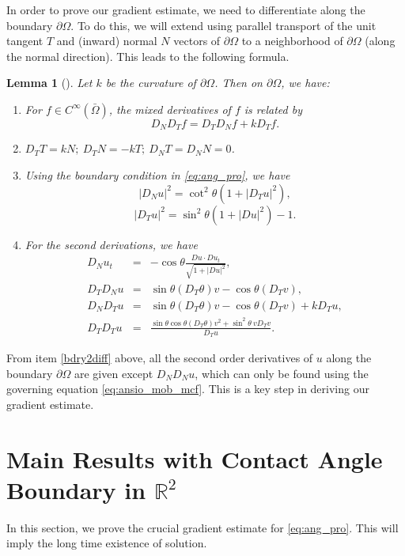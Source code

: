 \documentclass[12pt]{article}
\numberwithin{equation}{section}
\theoremstyle{plain}
\newtheorem{lemma}[theorem]{Lemma}
\theoremstyle{definition}
\theoremstyle{remark}
\begin{document}
In order to prove our gradient estimate, we need to differentiate along the boundary $\partial\Omega$. 
To do this, we will extend using parallel transport of the unit tangent $T$ and (inward) normal $N$ vectors of $\partial\Omega$ to a neighborhood of $\partial\Omega$ (along the normal direction). This leads to the following formula.
\begin{lemma}[\cite{AW2}]\label{lem:bd_grad_cal} Let $k$ be the curvature of $\partial\Omega$. Then on $\partial \Omega$, we have:
\begin{enumerate}
\item For $f\in C^{\infty}(\bar{\Omega})$, the mixed derivatives of $f$ is related by
\begin{equation*}
D_N D_T f=D_T D_N f+k D_T f.
\end{equation*}

\item $D_T T=k N;\ D_T N=-k T;\ D_N T=D_N N=0 $.
\item Using the boundary condition in \eqref{eq:ang_pro}, we have 
$$ |D_N u|^2 = \cot^2 \theta ( 1+|D_T u|^2), $$
$$ |D_T u|^2 = \sin^2 \theta ( 1+|Du|^2 ) - 1. $$
\item\label{bdry2diff} For the second derivations, we have
\begin{eqnarray*}
D_N u_t &=&-\cos{\theta} \frac{Du \cdot Du_t}{\sqrt{1+|Du|^2}},\\
D_T D_N u  &=& \sin{\theta}(D_T \theta)v-\cos{\theta}(D_T v),\\
D_N D_T u &=& \sin{\theta}(D_T \theta)v-\cos{\theta}(D_T v)+k D_T u,\\
D_T D_T u&=&\frac{ \sin{\theta} \cos{\theta} (D_T \theta)v^2+\sin ^2\theta \ vD_T v }{D_T u}.
\end{eqnarray*}
\end{enumerate}
\end{lemma}
From item \ref{bdry2diff} above,
all the second order derivatives of $u$ along the boundary $\partial\Omega$ are given except $D_N D_N u$, 
which can only be found using the governing equation \eqref{eq:ansio_mob_mcf}. This is a key step in deriving our gradient estimate.


\section{Main Results with Contact Angle Boundary in $\mathbb{R}^2$ }
\label{sec:ang_grad_est}
In this section, we prove the crucial gradient estimate for \eqref{eq:ang_pro}.
This will imply the long time existence of solution. 
\end{document}
